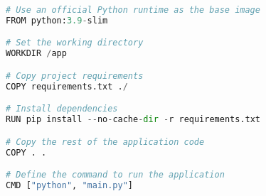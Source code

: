 \documentclass[12pt,a4paper]{article}
\begin{document}
\begin{tcolorbox}[title=Dockerfile Example, colback=gray!5!white, colframe=blue!75!black]
\begin{lstlisting}[language=Python]
# Use an official Python runtime as the base image
FROM python:3.9-slim

# Set the working directory
WORKDIR /app

# Copy project requirements
COPY requirements.txt ./

# Install dependencies
RUN pip install --no-cache-dir -r requirements.txt

# Copy the rest of the application code
COPY . .

# Define the command to run the application
CMD ["python", "main.py"]
\end{lstlisting}
\end{tcolorbox}

\end{document}
